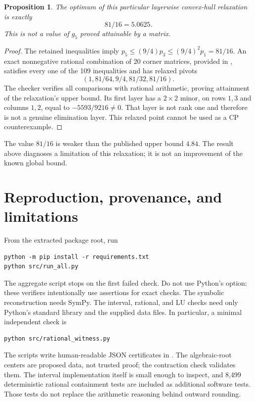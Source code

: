 \documentclass[11pt,letterpaper]{article}
\newtheorem{proposition}[theorem]{Proposition}
\newcommand{\code}[1]{\texttt{\detokenize{#1}}}
\begin{document}
\begin{proposition}
The optimum of this particular layerwise convex-hull relaxation is exactly
\[
                         81/16=5.0625.
\]
This is \emph{not} a value of $g_5$ proved attainable by a matrix.
\end{proposition}
\begin{proof}
The retained inequalities imply $p_5\le(9/4)p_3\le(9/4)^2p_1=81/16$. An exact nonnegative rational combination of 20 corner matrices, provided in \code{data/layer_hull_witness.json}, satisfies every one of the 109 inequalities and has relaxed pivots
\[
                     (1,81/64,9/4,81/32,81/16).
\]
The checker verifies all comparisons with rational arithmetic, proving attainment of the relaxation's upper bound. Its first layer has a $2\times2$ minor, on rows $1,3$ and columns $1,2$, equal to $-5593/9216\ne0$. That layer is not rank one and therefore is not a genuine elimination layer. This relaxed point cannot be used as a CP counterexample.\end{proof}
The value $81/16$ is weaker than the published upper bound $4.84$. The result above diagnoses a limitation of this relaxation; it is not an improvement of the known global bound.

\section{Reproduction, provenance, and limitations}\label{sec:reproduce}
From the extracted package root, run
\begin{verbatim}
python -m pip install -r requirements.txt
python src/run_all.py
\end{verbatim}
The aggregate script stops on the first failed check. Do not use Python's \code{-O} option: these verifiers intentionally use assertions for exact checks. The symbolic reconstruction needs SymPy. The interval, rational, and LU checks need only Python's standard library and the supplied data files. In particular, a minimal independent check is
\begin{verbatim}
python src/rational_witness.py
\end{verbatim}
The scripts write human-readable JSON certificates in \code{results/}. The algebraic-root centers are proposed data, not trusted proof; the contraction check validates them. The interval implementation itself is small enough to inspect, and 8,499 deterministic rational containment tests are included as additional software tests. Those tests do not replace the arithmetic reasoning behind outward rounding.
\end{document}
